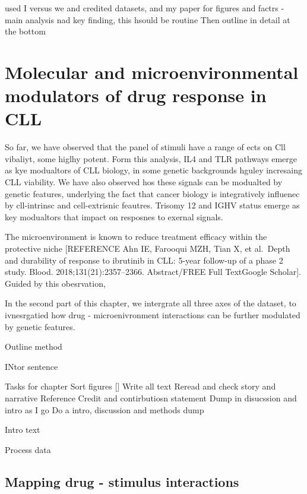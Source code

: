 \documentclass[11pt, a4paper, twosided]{book}
\begin{document}
used I versus we and credited datasets, and my paper for figures and factrs - main analysis nad key finding, this hsould be routine
Then outline in detail at the bottom

\hypertarget{molecular-and-microenvironmental-modulators-of-drug-response-in-cll}{%
\chapter{Molecular and microenvironmental modulators of drug response in CLL}\label{molecular-and-microenvironmental-modulators-of-drug-response-in-cll}}

So far, we have observed that the panel of stimuli have a range of ects on Cll vibaliyt, some higlhy potent. Form this analysis, IL4 and TLR pathways emerge as kye modualtors of CLL biology, in some genetic backgrounds hguley incresaing CLL viability. We have also observed hos these signals can be modualted by genetic features, underlying the fact that cancer biology is integratively influenec by cll-intrinsc and cell-extrisnic feautres. Trisomy 12 and IGHV status emerge as key modualtors that impact on resposnes to exernal signals.

The microenvironment is known to reduce treatment efficacy within the protective niche {[}REFERENCE Ahn IE, Farooqui MZH, Tian X, et al.~Depth and durability of response to ibrutinib in CLL: 5-year follow-up of a phase 2 study. Blood. 2018;131(21):2357--2366.
Abstract/FREE Full TextGoogle Scholar{]}. Guided by this obesrvation,

In the second part of this chapter, we intergrate all three axes of the dataset, to ivnesrgatied how drug - microenivronment interactions can be further modulated by genetic features.

Outline method

INtor sentence

Tasks for chapter
Sort figures {[}{]}
Write all text
Reread and check story and narrative
Reference
Credit and contirbutiosn statement
Dump in disucssion and intro as I go
Do a intro, discussion and methods dump

Intro text

Process data

\hypertarget{mapping-drug---stimulus-interactions}{%
\section{Mapping drug - stimulus interactions}\label{mapping-drug---stimulus-interactions}}
\end{document}
